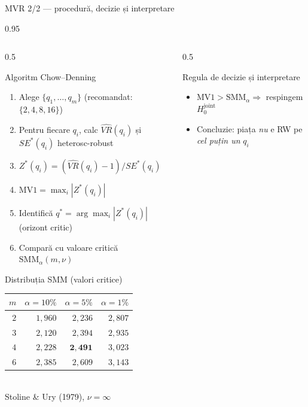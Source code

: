 \documentclass[9pt, aspectratio=169, t]{beamer}
\begin{document}
\begin{frame}[shrink=22]{MVR 2/2 --- procedură, decizie și interpretare}
\begin{cminipage}{0.95\textwidth}
\begin{columns}[T]
\begin{column}{0.5\textwidth}
\begin{exampleblock}{Algoritm Chow--Denning}
\footnotesize
\begin{enumerate}\setlength{\itemsep}{0pt}
    \item Alege $\{q_1, \ldots, q_m\}$ (recomandat: $\{2,4,8,16\}$)
    \item Pentru fiecare $q_i$, calc $\widehat{VR}(q_i)$ și $SE^*(q_i)$ heterosc-robust
    \item $Z^*(q_i) = (\widehat{VR}(q_i) - 1) / SE^*(q_i)$
    \item $\mathrm{MV1} = \max_{i} |Z^*(q_i)|$
    \item Identifică $q^* = \arg\max_i |Z^*(q_i)|$ (orizont critic)
    \item Compară cu valoare critică $\mathrm{SMM}_{\alpha}(m, \nu)$
\end{enumerate}
\end{exampleblock}
\begin{block}{Distribuția SMM (valori critice)}
\footnotesize
\begin{tabular}{rrrr}
\toprule
$m$ & $\alpha = 10\%$ & $\alpha = 5\%$ & $\alpha = 1\%$ \\
\midrule
$2$ & $1{,}960$ & $2{,}236$ & $2{,}807$ \\
$3$ & $2{,}120$ & $2{,}394$ & $2{,}935$ \\
$4$ & $2{,}228$ & $\mathbf{2{,}491}$ & $3{,}023$ \\
$6$ & $2{,}385$ & $2{,}609$ & $3{,}143$ \\
\bottomrule
\end{tabular}
\\[0.1cm]
\footnotesize Stoline \& Ury (1979), $\nu = \infty$
\end{block}
\end{column}
\begin{column}{0.5\textwidth}
\begin{exampleblock}{Regula de decizie și interpretare}
\footnotesize
\begin{itemize}\setlength{\itemsep}{0pt}
    \item $\mathrm{MV1} > \mathrm{SMM}_\alpha \Rightarrow$ respingem $H_0^{\text{joint}}$
    \item Concluzie: piața \emph{nu} e RW pe \emph{cel puțin un} $q_i$

\end{itemize}
\end{exampleblock}
\end{column}
\end{columns}
\end{cminipage}
\end{frame}
\end{document}
